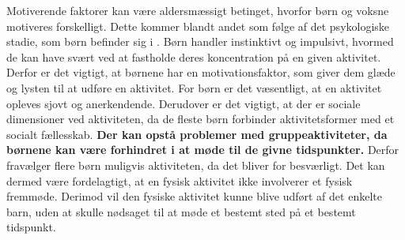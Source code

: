 Motiverende faktorer kan være aldersmæssigt betinget, hvorfor børn og voksne motiveres forskelligt. Dette kommer blandt andet som følge af det psykologiske stadie, som børn befinder sig i \citep{V.Brown2007}. Børn handler instinktivt og impulsivt, hvormed de kan have svært ved at fastholde deres koncentration på en given aktivitet. Derfor er det vigtigt, at børnene har en motivationsfaktor, som giver dem glæde og lysten til at udføre en aktivitet. \citep{V.Brown2007} \newline
For børn er det væsentligt, at en aktivitet opleves sjovt og anerkendende. %
Derudover er det vigtigt, at der er sociale dimensioner ved aktiviteten, da de fleste børn forbinder aktivitetsformer med et socialt fællesskab. \textbf{Der kan opstå problemer med gruppeaktiviteter, da børnene kan være forhindret i at møde til de givne tidspunkter.} %
Derfor fravælger flere børn muligvis aktiviteten, da det bliver for besværligt. Det kan dermed være fordelagtigt, at en fysisk aktivitet ikke involverer et fysisk fremmøde. Derimod vil den fysiske aktivitet kunne blive udført af det enkelte barn, uden at skulle nødsaget til at møde et bestemt sted på et bestemt tidspunkt.  \citep{Wied2011,Romani2013}\newline

